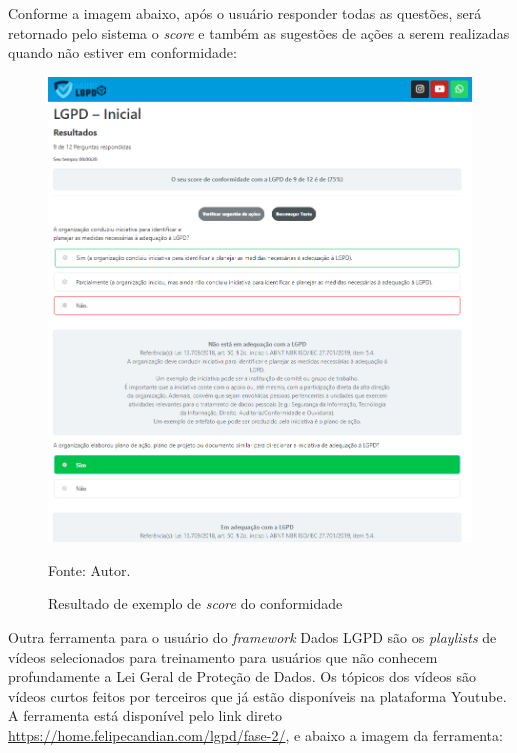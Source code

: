 \documentclass[
	12pt,				%
	openright,			%
	oneside,			%
	a4paper,			%
	english,			%
	french,				%
	spanish,			%
	brazil,				%
	]{abntex2}
\begin{document}
\pagebreak

Conforme a imagem abaixo, após o usuário responder todas as questões, será retornado pelo sistema o \textit{score} e também as sugestões de ações a serem realizadas quando não estiver em conformidade:
\begin{figure}[ht]
    \centering
    \caption{Resultado de exemplo de \textit{score} do conformidade }
    \includegraphics[width=6.8in]{Images/resultado.png}
    \label{fig: resultado}
    
    \centering \small Fonte: Autor.
\end{figure}

\pagebreak

Outra ferramenta para o usuário do \textit{framework} Dados LGPD são os \textit{playlists} de vídeos selecionados para treinamento para usuários que não conhecem profundamente a Lei Geral de Proteção de Dados. Os tópicos dos vídeos são vídeos curtos feitos por terceiros que já estão disponíveis na plataforma Youtube.
A ferramenta está disponível pelo link direto \url{https://home.felipecandian.com/lgpd/fase-2/}, e abaixo a imagem da ferramenta:
\end{document}
